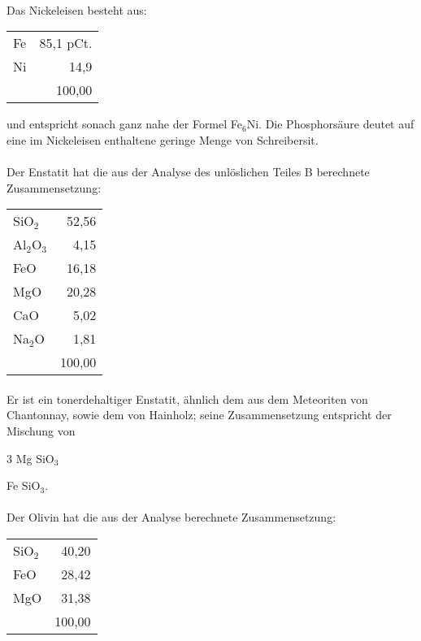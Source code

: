 \documentclass[a4paper, 11pt, oneside]{article}
\begin{document}
\paragraph{}
Das Nickeleisen besteht aus:
\normalsize
\begin{center}
\begin{tabular}{ l r }
    Fe & 85,1 pCt.\\
    Ni & 14,9\\
     & 100,00\\
\end{tabular}
\end{center}
\LARGE
und entspricht sonach ganz nahe der Formel Fe$_{6}$Ni. Die Phosphorsäure deutet auf eine im Nickeleisen enthaltene geringe Menge von Schreibersit.
\paragraph{}
Der Enstatit hat die aus der Analyse des unlöslichen Teiles B berechnete Zusammensetzung:
\normalsize
\begin{center}
\begin{tabular}{ l r }
    SiO$_{2}$ & 52,56\\
    Al$_{2}$O$_{3}$ & 4,15\\
    FeO & 16,18\\
    MgO & 20,28\\
    CaO & 5,02\\
    Na$_{2}$O & 1,81\\
     & 100,00\\
\end{tabular}
\end{center}
\LARGE
\paragraph{}
Er ist ein tonerdehaltiger Enstatit, ähnlich dem aus dem Meteoriten von Chantonnay, sowie dem von Hainholz; seine Zusammensetzung entspricht der Mischung von
\large
\begin{center}
3 Mg SiO$_{3}$
\end{center}
\begin{center}
Fe SiO$_{3}$.
\end{center}
\LARGE
\paragraph{}
Der Olivin hat die aus der Analyse berechnete Zusammensetzung:
\large
\begin{center}
\begin{tabular}{ l r }
    SiO$_{2}$ & 40,20\\
    FeO & 28,42\\
    MgO & 31,38\\
     & 100,00\\
\end{tabular}
\end{center}
\LARGE
\end{document}
